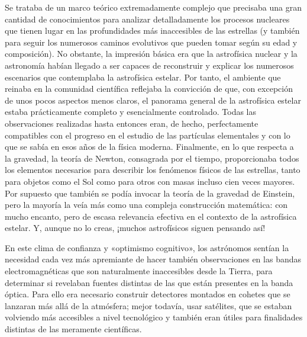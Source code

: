 Se trataba de un marco teórico extremadamente complejo que precisaba una gran cantidad de conocimientos para analizar detalladamente los procesos nucleares que tienen lugar en las profundidades más inaccesibles de las estrellas (y también para seguir los numerosos caminos evolutivos que pueden tomar según su edad y composición). No obstante, la impresión básica era que la astrofísica nuclear y la astronomía habían llegado a ser capaces de reconstruir y explicar los numerosos escenarios que contemplaba la astrofísica estelar. Por tanto, el ambiente que reinaba en la comunidad científica reflejaba la convicción de que, con excepción de unos pocos aspectos menos claros, el panorama general de la astrofísica estelar estaba prácticamente completo y esencialmente controlado. Todas las observaciones realizadas hasta entonces eran, de hecho, perfectamente compatibles con el progreso en el estudio de las partículas elementales y con lo que se sabía en esos años de la física moderna. Finalmente, en lo que respecta a la gravedad, la teoría de Newton, consagrada por el tiempo, proporcionaba todos los elementos necesarios para describir los fenómenos físicos de las estrellas, tanto para objetos como el Sol como para otros con masas incluso cien veces mayores. Por supuesto que también se podía invocar la teoría de la gravedad de Einstein, pero la mayoría la veía más como una compleja construcción matemática: con mucho encanto, pero de escasa relevancia efectiva en el contexto de la astrofísica estelar. Y, aunque no lo creas, ¡muchos astrofísicos siguen pensando así!

En este clima de confianza y «optimismo cognitivo», los astrónomos sentían la necesidad cada vez más apremiante de hacer también observaciones en las bandas electromagnéticas que son naturalmente inaccesibles desde la Tierra, para determinar si revelaban fuentes distintas de las que están presentes en la banda óptica. Para ello era necesario construir detectores montados en cohetes que se lanzaran más allá de la atmósfera; mejor todavía, usar satélites, que se estaban volviendo más accesibles a nivel tecnológico y también eran útiles para finalidades distintas de las meramente científicas.

